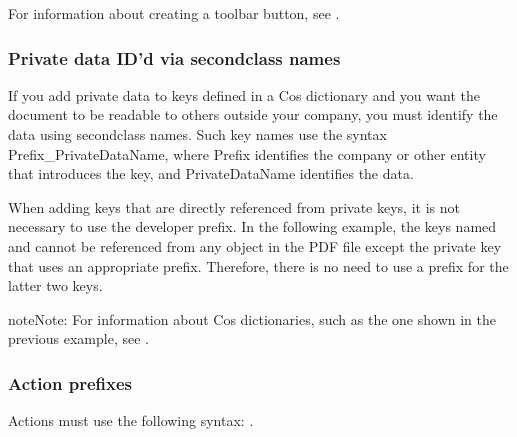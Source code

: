 \documentclass[letterpaper,12pt,english,openany,oneside]{sphinxmanual}
\begin{document}
For information about creating a toolbar button, see .


\subsubsection{Private data ID’d via second\sphinxhyphen{}class names}
\label{\detokenize{Plugins_Pimech:private-data-id-d-via-second-class-names}}
If you add private data to keys defined in a Cos dictionary and you want the document to be readable to others outside your company, you must identify the data using second\sphinxhyphen{}class names. Such key names use the syntax Prefix\_PrivateDataName, where Prefix identifies the company or other entity that introduces the key, and PrivateDataName identifies the data.

When adding keys that are directly referenced from private keys, it is not necessary to use the developer prefix. In the following example, the keys named  and  cannot be referenced from any object in the PDF file except the private key that uses an appropriate prefix. Therefore, there is no need to use a prefix for the latter two keys.

\begin{sphinxVerbatim}[commandchars=\\\{\}]
       \PYG{p}{[}   \PYG{p}{]}  
\end{sphinxVerbatim}

\begin{sphinxadmonition}{note}{Note:}
For information about Cos dictionaries, such as the one shown in the previous example, see .
\end{sphinxadmonition}


\subsubsection{Action prefixes}
\label{\detokenize{Plugins_Pimech:action-prefixes}}
Actions must use the following syntax: .

\begin{sphinxVerbatim}[commandchars=\\\{\}]
   
\end{sphinxVerbatim}
\end{document}
